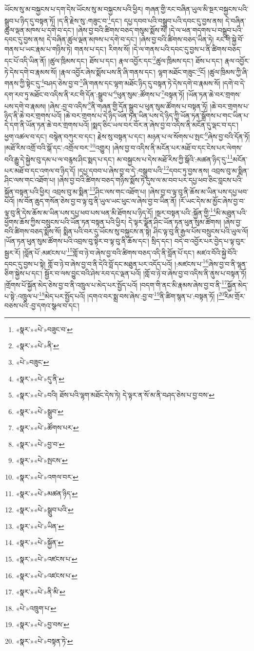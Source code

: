 ཡོངས་སུ་མ་བསྐྱངས་པ་དག་དེས་ཡོངས་སུ་མ་བསྐྱངས་པའི་ཕྱིར། གཞན་གྱི་རང་བཞིན་ཡུལ་མི་སྔར་བསྐྱངས་པའི་སྒྲུབ་པ་ཉིད་དུ་བསྟན་ཏོ། །ད་ནི་རྗེས་སུ་:གཟུང་བ་\footnote{«སྣར་»«པེ་»བཟུང་བ་}དང་། དཔྱ་དབབ་པའི་བསྒྲུབ་པའི་དབང་དུ་བྱས་ནས། དེ་བཞིན་ཚུལ་ལྡན་མཁས་པ་དགེ་བ་དང་། །ཞེས་བྱ་བའི་ཚིགས་བཅད་གསུམ་སྨོས་སོ། །དེ་ལ་ཕན་གདགས་པ་བསྒྲུབ་པའི་དབང་དུ་བྱས་ནས། དེ་བཞིན་ཚུལ་ལྡན་མཁས་པ་དགེ་བ་དང་། །ཞེས་བྱ་བའི་ཚིགས་བཅད་ཡིན་ཏེ། རང་གི་སྐྱེ་བོ་གནས་པ་ཡང་རྣམ་པ་གཉིས་ཏེ། གནས་པ་དང་། རིགས་སོ། །དེ་ལ་གནས་པའི་དབང་དུ་བྱས་པ་ནི་ཚིགས་བཅད་དང་པོ་འདི་ཡིན་ནོ། །ཚུལ་ཁྲིམས་དང་། ཐོས་པ་དང་། རྣལ་འབྱོར་དང་\footnote{«སྣར་»«པེ་»ནི་}ཚུལ་ཁྲིམས་དང་། ཐོས་པ་དང་། རྣལ་འབྱོར་ཏེ་དེས་དགེ་བ་རྣམས་སོ། །རྣལ་འབྱོར་ཞེས་སྨོས་པས་ནི་ཞི་གནས་དང་། ལྷག་མཐོང་གཟུང་\footnote{«པེ་»བཟུང་}ངོ། །ཚུལ་ཁྲིམས་ཀྱི་ཞི་གནས་ཀྱི་སྟེང་དུ་\footnote{«སྣར་»«པེ་»དུ་ནི་}བཤད་ཅེས་བྱ་བ་\footnote{«སྣར་»«པེ་»བའི། ཐོས་པའི་ལྷག་མཐོང་དེས་ཏེ། དེ་ལྟར་ན་སོ་མ་ནི་བཤད་ཅེས་པ་བྱ་བས་}ཞི་གནས་དང་ལྷག་མཐོང་ཉིད་དུ་བསྟན་ཏེ་དེས་དགེ་བ་རྣམས་སོ། །དགེ་བ་དེ་དག་རབ་ཏུ་མཐོང་བ་འདིས་ནི་རང་གི་དོན་:སྒྲུབ་པ་\footnote{«སྣར་»«པེ་»སྒྲུབ་}ཕུན་སུམ་:ཚོགས་པ་\footnote{«སྣར་»«པེ་»ཚོགས་པར་}བསྟན་ཏོ། །ཡོན་ཏན་ཆེ་བར་གྲགས་པས་དགེ་བ་རྣམས། །ཞེས་:བྱ་བ་འདིས་\footnote{«སྣར་»«པེ་»བྱ་བ་}ནི་གཞན་གྱི་དོན་སྒྲུབ་པ་ཕུན་སུམ་ཚོགས་པ་བསྟན་ཏོ། །ཆེ་བར་གྲགས་པ་ཉིད་ནི་ཆེ་བར་གྲགས་པའོ། །ཆེ་བར་གྲགས་པ་དེ་ཉིད་ཡོན་ཏན་ཡིན་པས་དེ་ཉིད་ཀྱི་ཡོན་ཏན་སྒྲོགས་པ་གང་ཡིན་པ་དེ་དག་ནི་ཡོན་ཏན་ཆེ་བར་གྲགས་པའོ། །སྨད་ཅིང་ཡལ་བར་བོར་ན་ཞེས་བྱ་བ་འདིས་ནི་མངོན་དུ་ལྡང་བ་དང་། ཕྱག་འཚལ་བ་དང་། བསྙེན་བཀུར་བ་དང་། རྗེས་སུ་བསྟན་པ་དང་། མཉན་པ་ལ་སོགས་པ་སྤང་\footnote{«སྣར་»«པེ་»སྤངས་}ཞེས་བྱ་བའི་དོན་ཏོ། །མཐོ་རིས་འགྲོ་བའི་སྒོ་དང་:འགྲོལ་བར་\footnote{«སྣར་»«པེ་»འགལ་བར་}འགྱུར། །ཞེས་བྱ་བ་འདིས་ནི་མངོན་པར་མཐོ་བ་དང་ངེས་པར་ལེགས་བའི་རྒྱུ་དེ་སྐྱེས་བུ་དམ་པ་ལ་བརྙས་ཤིང་སྨད་པ་དང་། མ་བསྐྱངས་པ་དེས་མཐོ་རིས་ཀྱི་སྒོའི་:མཚན་ཉིད་དུ་\footnote{«སྣར་»«པེ་»མཚན་ཉིད་}མངོན་པར་མཐོ་བ་དང་འགལ་བ་ཉིད་དོ། །དཔྱ་དབབ་པ་ཞེས་བྱ་བ་དེ་:བསྒྲུབ་པའི་\footnote{«སྣར་»«པེ་»སྒྲུབ་པའི་}དབང་ཏུ་བྱས་ནས། འབྲས་བུ་མ་སྨིན་ཤིང་ལས་གང་འཐོག་པ། །ཞེས་བྱ་བའི་ཚིགས་བཅད་གཉིས་སྨོས་ཏེ་དུས་ལ་མ་བབ་པར་དཔྱ་ཕབ་ཅིང་བླངས་པའི་སྐྱོན་བསྟན་པའི་ཕྱིར། འབྲས་བུ་མ་སྨིན་\footnote{«སྣར་»«པེ་»ཡིན་}ཤིང་ལས་གང་འཐོག་པ། །ཞེས་བྱ་བ་ལྟ་བུ་ནི་ཆོས་མ་ཡིན་པས་དཔྱ་ཕབ་པའོ། །ས་བོན་ཆུད་གསོན་ཅེས་བྱ་བ་ལྟ་བུ་ནི་ཡུལ་ཡང་ཕུང་ལ་ཞེས་བྱ་བ་ཡིན་ནོ། །རོ་ཡང་དེས་མ་མྱོང་ཞེས་བྱ་བ་ལྟ་བུ་ནི་དེས་ཆོས་མ་ཡིན་པས་དཔྱ་ཕབ་པས་ཕན་མི་ཐོགས་པ་ཉིད་དོ། །སྔར་བསྟན་པའི་:སྐྱོན་གྱི་\footnote{«སྣར་»«པེ་»སྐྱོན་}མི་མཐུན་པའི་ཕྱོགས་ཆོས་ཀྱིས་བསྲུངས་པའི་ཡོན་ཏན་བསྟན་པའི་ཕྱིར། དེ་ལྟར་ལྗོན་ཤིང་ཡོན་ཏན་ཕུན་སུམ་ཚོགས། །ཞེས་བྱ་བའི་ཚིགས་བཅད་སྨོས་སོ། སྨིན་པའི་བར་དུ་ཡོངས་སུ་བསྐྱངས་ན་སྟེ། ཤིང་ལྟ་བུ་ནི་རྒྱལ་པོས་བསྲུངས་པའི་ཡུལ་ལོ། །ཡོན་ཏན་ཕུན་སུམ་ཚོགས་པའི་འབྲས་བུ་སྟེར་བ་ལྟ་བུ་ནི་ཆོས་དང་། སྲིད་དང་། བདེ་བ་འབྱོར་པར་བྱེད་པ་ལྟ་བུར་སྦྱར་རོ། །བློན་པོ་:མཛངས་པ་\footnote{«སྣར་»«པེ་»འཛངས་པ་}གློ་བ་ཉེ་བ་ཞེས་བྱ་བའི་ཚིགས་བཅད་འདི་ནི་བློན་པོ་དང་། མཛའ་བོའི་སྐྱེ་བོའི་དབང་དུ་བྱས་པ་སྟེ། གློ་བ་ཉེ་བ་ཞེས་བྱ་བ་ནི་དེའི་བློ་དང་མཐུན་པར་འདོད་པའོ། །:མཛངས་པ་\footnote{«སྣར་»«པེ་»འཛངས་པ་}ཞེས་བྱ་བ་ནི་ལྷན་ཅིག་སྐྱེས་པ་དང་། སྦྱོར་བ་ལས་བྱུང་བའི་ཤེས་རབ་དང་ལྡན་པའོ། །གློ་བ་ཉེ་བ་ཞེས་བྱ་བ་འདིས་ནི་ནུས་པ་བསྟན་ཏོ། །གྲོགས་པོ་སྐྱོན་མེད་ཅེས་བྱ་བ་ནི་འཁྲུལ་པ་མེད་པར་སྤྱོད་པའོ། །བདག་གི་ནང་མི་རྣམས་ཞེས་བྱ་བ་ནི་\footnote{«སྣར་»«པེ་»ནི་མི་}སྐྱོན་མེད་པ་སྟེ་:འཁྲུལ་པ་\footnote{«པེ་»འཁྲུག་པ་}མེད་པར་སྤྱོད་པའོ། །དགའ་བར་སྨྲ་བས་ཞེས་:བྱ་བ་\footnote{«སྣར་»«པེ་»བྱ་བས་}ནི་ཚིག་སྙན་པ་:བསྟན་ཏོ། །\footnote{«སྣར་»«པེ་»བསྟན་ཏེ་}རིམ་གྲོར་བཅས་པའི་:བྱ་དགའ་སྩལ་བ་དང་། 